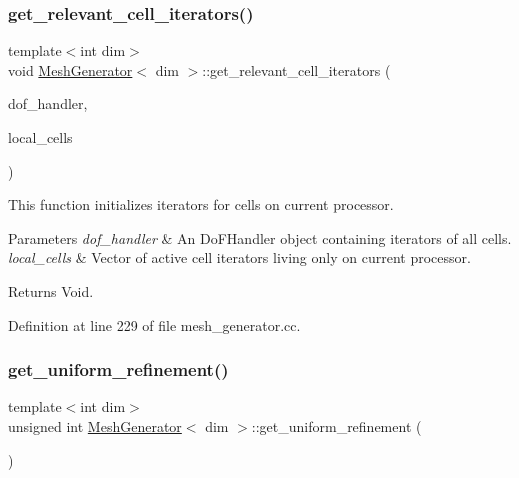\subsubsection{\texorpdfstring{get\+\_\+relevant\+\_\+cell\+\_\+iterators()}{get\_relevant\_cell\_iterators()}}
{\footnotesize\ttfamily template$<$int dim$>$ \\
void \hyperlink{class_mesh_generator}{Mesh\+Generator}$<$ dim $>$\+::get\+\_\+relevant\+\_\+cell\+\_\+iterators (\begin{DoxyParamCaption}\item[{const Do\+F\+Handler$<$ dim $>$ \&}]{dof\+\_\+handler,  }\item[{std\+::vector$<$ typename Do\+F\+Handler$<$ dim $>$\+::active\+\_\+cell\+\_\+iterator $>$ \&}]{local\+\_\+cells }\end{DoxyParamCaption})}

This function initializes iterators for cells on current processor.


\begin{DoxyParams}{Parameters}
{\em dof\+\_\+handler} & An Do\+F\+Handler object containing iterators of all cells. \\
\hline
{\em local\+\_\+cells} & Vector of active cell iterators living only on current processor. \\
\hline
\end{DoxyParams}
\begin{DoxyReturn}{Returns}
Void. 
\end{DoxyReturn}


Definition at line 229 of file mesh\+\_\+generator.\+cc.

\mbox{\label{class_mesh_generator_aabb238d5d787e8c9834e4a31d2cc5ea9}} 
\subsubsection{\texorpdfstring{get\+\_\+uniform\+\_\+refinement()}{get\_uniform\_refinement()}}
{\footnotesize\ttfamily template$<$int dim$>$ \\
unsigned int \hyperlink{class_mesh_generator}{Mesh\+Generator}$<$ dim $>$\+::get\+\_\+uniform\+\_\+refinement (\begin{DoxyParamCaption}{ }\end{DoxyParamCaption})}

